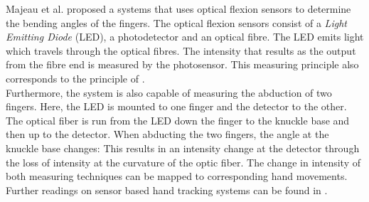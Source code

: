 Majeau et al. \cite{Majeau.2012} proposed a systems that uses optical flexion sensors to determine the bending angles of the fingers. The optical flexion sensors consist of a \textit{Light Emitting Diode} (LED), a photodetector and an optical fibre. The LED emits light which travels through the optical fibres. The intensity that results as the output from the fibre end is measured by the photosensor. This measuring principle also corresponds to the principle of \cite{ThomasA.DeFanti.1977}. \\Furthermore, the system is also capable of measuring the abduction of two fingers. Here, the LED is mounted to one finger and the detector to the other. The optical fiber is run from the LED down the finger to the knuckle base and then up to the detector. When abducting the two fingers, the angle at the knuckle base changes: This results in an intensity change at the detector through the loss of intensity at the curvature of the optic fiber.
The change in intensity of both measuring techniques can be mapped to corresponding hand movements.
Further readings on sensor based hand tracking systems can be found in \cite{Dipietro.2008,Sturman.1994}.
